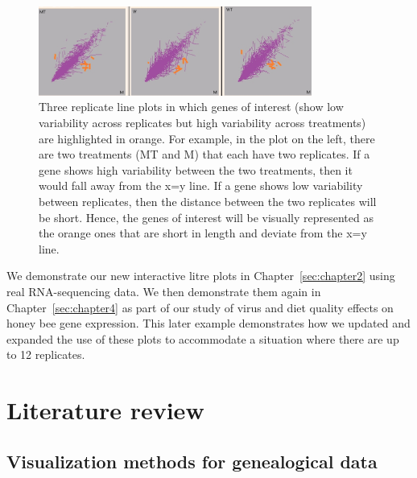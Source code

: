 \documentclass[11pt,a4paper,oldfontcommands,openany]{memoir}
\numberwithin{equation}{section} %
\begin{document}
\begin{enumerate}
\begin{figure}[H]
\centering
    \begin{framed}
    \includegraphics[width=0.8\textwidth]{porcupine}
    \end{framed}
    \caption{Three replicate line plots in which genes of interest (show low variability across replicates but high variability across treatments) are highlighted in orange. For example, in the plot on the left, there are two treatments (MT and M) that each have two replicates. If a gene shows high variability between the two treatments, then it would fall away from the x=y line. If a gene shows low variability between replicates, then the distance between the two replicates will be short. Hence, the genes of interest will be visually represented as the orange ones that are short in length and deviate from the x=y line.}
    \label{fig:porcupine}
\end{figure}

We demonstrate our new interactive litre plots in Chapter~\ref{sec:chapter2} using real RNA-sequencing data. We then demonstrate them again in Chapter~\ref{sec:chapter4} as part of our study of virus and diet quality effects on honey bee gene expression. This later example demonstrates how we updated and expanded the use of these plots to accommodate a situation where there are up to 12 replicates.

\end{enumerate}


\section{Literature review}
\label{sec:litReview}
\subsection{Visualization methods for genealogical data}
\end{document}
